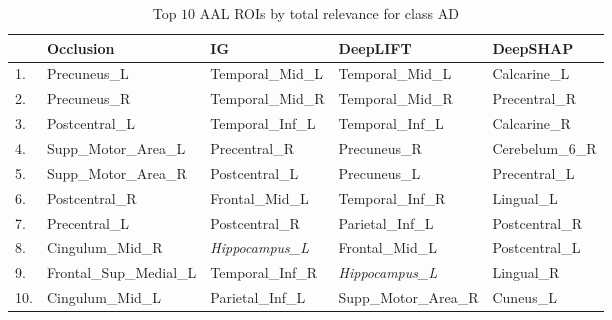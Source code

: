 \begin{table}
	\centering
	\footnotesize
	\begin{tabularx}{\textwidth}{lXXXX}
		\toprule
		    & Occlusion               & IG                    & DeepLIFT              & DeepSHAP        \\
		\midrule
		1.  & Precuneus\_L            & Temporal\_Mid\_L      & Temporal\_Mid\_L      & Calcarine\_L    \\
		2.  & Precuneus\_R            & Temporal\_Mid\_R      & Temporal\_Mid\_R      & Precentral\_R   \\
		3.  & Postcentral\_L          & Temporal\_Inf\_L      & Temporal\_Inf\_L      & Calcarine\_R    \\
		4.  & Supp\_Motor\_Area\_L    & Precentral\_R         & Precuneus\_R          & Cerebelum\_6\_R \\
		5.  & Supp\_Motor\_Area\_R    & Postcentral\_L        & Precuneus\_L          & Precentral\_L   \\
		6.  & Postcentral\_R          & Frontal\_Mid\_L       & Temporal\_Inf\_R      & Lingual\_L      \\
		7.  & Precentral\_L           & Postcentral\_R        & Parietal\_Inf\_L      & Postcentral\_R  \\
		8.  & Cingulum\_Mid\_R        & \emph{Hippocampus\_L} & Frontal\_Mid\_L       & Postcentral\_L  \\
		9.  & Frontal\_Sup\_Medial\_L & Temporal\_Inf\_R      & \emph{Hippocampus\_L} & Lingual\_R      \\
		10. & Cingulum\_Mid\_L        & Parietal\_Inf\_L      & Supp\_Motor\_Area\_R  & Cuneus\_L       \\
	\end{tabularx}
	\caption*{Top $10$ AAL ROIs by total relevance for class AD}\label{tab:top10-total}
\end{table}
